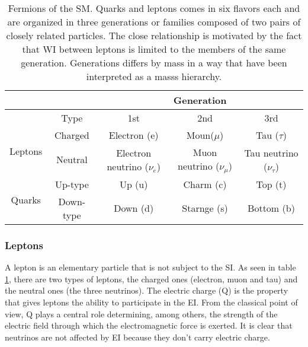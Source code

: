 \begin{center}
\begin{table}[h!]
\centering
\footnotesize
\begin{tabular}{ccccc} \hline
                         &         & \multicolumn{3}{c}{Generation}                                                           \\ \hline
                         &Type     & 1st                          & 2nd                        & 3rd                          \\ \hline
\multirow{2}{*}{Leptons} &Charged  & Electron (e)                 & Moun($\mu$)                & Tau ($\tau$)                 \\%
                         &Neutral  & Electron neutrino ($\nu_e$)  & Muon neutrino ($\nu_{\mu}$) & Tau neutrino ($\nu_{\tau}$) \\\hline
\multirow{2}{*}{Quarks}  &Up-type  & Up (u)                       & Charm (c)                & Top (t)                        \\%
                         &Down-type& Down (d)                     & Starnge (s)              & Bottom (b)                     \\\hline
\end{tabular}
\caption[Fermions of the SM.]{Fermions of the SM. Quarks and leptons comes in six flavors each and are organized in three generations or families composed of two pairs of closely related particles. The close relationship is motivated by the fact that WI between leptons is limited to the members of the same generation. Generations differs by mass in a way that have been interpreted as a masss hierarchy.}\label{flav_gen}
\end{table}
\end{center}

\subsubsection{Leptons}

\noindent A lepton is an elementary particle that is not subject to the SI. As seen in table \ref{flav_gen}, there are two types of leptons, the charged ones (electron, muon and tau) and the neutral ones (the three neutrinos). The electric charge (Q) is the property that gives leptons the ability to participate in the EI. From the classical point of view, Q plays a central role determining, among others, the strength of the electric field through which the electromagnetic force is exerted. It is clear that neutrinos are not affected by EI because they don't carry electric charge.\\

